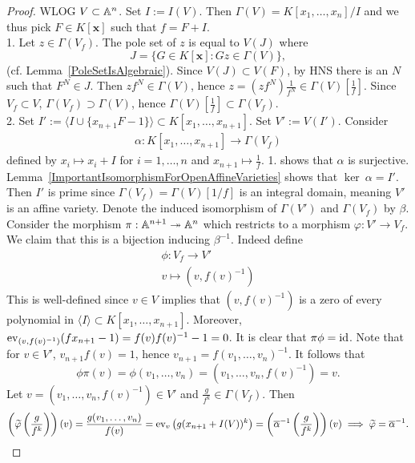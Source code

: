     \begin{proof}
        WLOG $V\subset \mathbb{A}^n$. Set $I:= I(V)$. Then $\Gamma(V) = K[x_1,\dots,x_n]/I$ and we thus pick $F\in K[\mathbf{x}]$ such that $f=F+I$.\\
        1. Let $z\in \Gamma(V_f)$. The pole set of $z$ is equal to $V(J)$ where $$J= \{ G\in K[\mathbf{x}] : Gz\in \Gamma(V)\},$$
        (cf. Lemma~\ref{PoleSetIsAlgebraic}). Since $V(J)\subset V(F)$, by HNS there is an $N$ such that $F^N\in J$. Then $zf^N\in \Gamma(V)$, hence $z=(zf^N)\frac{1}{f^N}\in \Gamma(V)\left[\frac{1}{f}\right]$. Since $V_f\subset V$, $\Gamma(V_f)\supset \Gamma(V)$, hence $\Gamma(V)\left[\frac{1}{f}\right]\subset \Gamma(V_f)$.\\
        2. Set $I' := \langle I\cup \{x_{n+1}F-1\}\rangle\subset K[x_1,\dots,x_{n+1}]$. Set $V' := V(I')$. Consider 
        \begin{gather*}
            \alpha : K[x_1,\dots,x_{n+1}] \rightarrow \Gamma(V_f)
        \end{gather*}
        defined by $x_i \mapsto x_i+I$ for $i=1,\dots,n$ and $x_{n+1}\mapsto \frac{1}{f}$. 1. shows that $\alpha$ is surjective. Lemma~\ref{ImportantIsomorphismForOpenAffineVarieties} shows that $\ker\ \alpha = I'$. Then $I'$ is prime since $\Gamma(V_f)=\Gamma(V)[1/f]$ is an integral domain, meaning $V'$ is an affine variety. Denote the induced isomorphism of $\Gamma(V')$ and $\Gamma(V_f)$ by $\beta$. Consider the morphism $\pi : \mathbb{A}^{n+1}\twoheadrightarrow \mathbb{A}^n$ which restricts to a morphism $\varphi: V' \rightarrow V_f$. We claim that this is a bijection inducing $\beta^{-1}$. Indeed define 
        \begin{gather*}
            \phi: V_f\rightarrow V'\\
            v\mapsto (v,f(v)^{-1})
        \end{gather*}
        This is well-defined since $v\in V$ implies that $(v,f(v)^{-1})$ is a zero of every polynomial in $\langle I\rangle \subset K[x_1,\dots,x_{n+1}]$. Moreover, $\mathrm{ev}_{(v,f(v)^{-1})}(fx_{n+1}-1)= f(v)f(v)^{-1}-1=0$. It is clear that $\pi\phi=\mathrm{id}$. Note that for $v\in V'$, $v_{n+1}f(v)=1$, hence $v_{n+1}=f(v_1,\dots,v_n)^{-1}$. It follows that 
        $$\phi\pi(v)=\phi(v_1,\dots,v_n)=(v_1,\dots,v_n,f(v)^{-1}) =v.$$
        Let $v=(v_1,\dots,v_n,f(v)^{-1})\in V'$ and $\frac{g}{f^k}\in \Gamma(V_f)$. Then 
        \begin{align*}
            \left(\widetilde{\varphi}\left(\frac{g}{f^k}\right)\right)(v)= \frac{g(v_1,\dots,v_n)}{f(v)}= \ev_v\left(g(x_{n+1}+I(V))^k\right) = \left(\overline{\alpha}^{-1}\left(\frac{g}{f^k}\right)\right)(v) \implies \widetilde{\varphi} = \overline{\alpha}^{-1}. 

\end{align*}
\end{proof}
